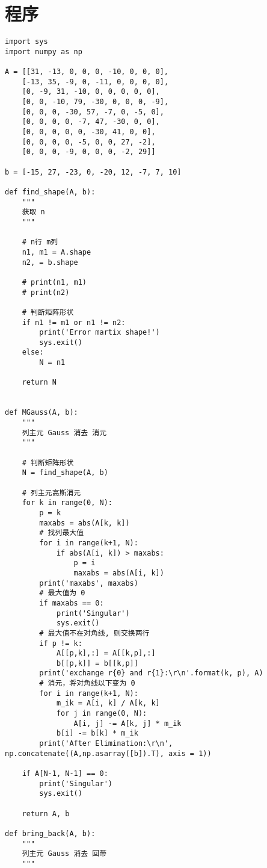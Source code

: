 \section{程序}

\begin{lstlisting}[style = python]
import sys
import numpy as np

A = [[31, -13, 0, 0, 0, -10, 0, 0, 0],
    [-13, 35, -9, 0, -11, 0, 0, 0, 0],
    [0, -9, 31, -10, 0, 0, 0, 0, 0],
    [0, 0, -10, 79, -30, 0, 0, 0, -9],
    [0, 0, 0, -30, 57, -7, 0, -5, 0],
    [0, 0, 0, 0, -7, 47, -30, 0, 0],
    [0, 0, 0, 0, 0, -30, 41, 0, 0],
    [0, 0, 0, 0, -5, 0, 0, 27, -2],
    [0, 0, 0, -9, 0, 0, 0, -2, 29]]

b = [-15, 27, -23, 0, -20, 12, -7, 7, 10]

def find_shape(A, b):
    """
    获取 n
    """

    # n行 m列
    n1, m1 = A.shape
    n2, = b.shape

    # print(n1, m1)
    # print(n2)

    # 判断矩阵形状
    if n1 != m1 or n1 != n2:
        print('Error martix shape!')
        sys.exit()
    else:
        N = n1

    return N
    

def MGauss(A, b):
    """
    列主元 Gauss 消去 消元
    """

    # 判断矩阵形状
    N = find_shape(A, b)

    # 列主元高斯消元
    for k in range(0, N):
        p = k
        maxabs = abs(A[k, k])
        # 找列最大值
        for i in range(k+1, N):
            if abs(A[i, k]) > maxabs:
                p = i
                maxabs = abs(A[i, k])
        print('maxabs', maxabs)
        # 最大值为 0
        if maxabs == 0:
            print('Singular')
            sys.exit()
        # 最大值不在对角线, 则交换两行
        if p != k:
            A[[p,k],:] = A[[k,p],:]
            b[[p,k]] = b[[k,p]]
        print('exchange r{0} and r{1}:\r\n'.format(k, p), A)
        # 消元，将对角线以下变为 0
        for i in range(k+1, N):
            m_ik = A[i, k] / A[k, k]
            for j in range(0, N):
                A[i, j] -= A[k, j] * m_ik
            b[i] -= b[k] * m_ik
        print('After Elimination:\r\n', np.concatenate((A,np.asarray([b]).T), axis = 1))
        
    if A[N-1, N-1] == 0:
        print('Singular')
        sys.exit()
    
    return A, b
        
def bring_back(A, b):
    """
    列主元 Gauss 消去 回带
    """
    

\end{lstlisting}
